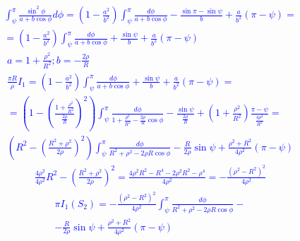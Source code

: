 %
\textcolor{blue}{ \begin{equation*} \begin{aligned}
\int_{\psi}^{\pi} \frac{\sin^2{\phi}}{a + b \cos \phi} d \phi =  
\left( 1 - \frac{a^2}{b^2} \right)
\int_{\psi}^{\pi} \frac{d \phi}{a + b \cos \phi} -
\frac{\sin \pi - \sin \psi}{b} + \frac{a}{b^2} (\pi - \psi) = \\
= \left( 1 - \frac{a^2}{b^2} \right)
\int_{\psi}^{\pi} \frac{d \phi}{a + b \cos \phi} +
\frac{\sin \psi}{b} + \frac{a}{b^2} (\pi - \psi)
\end{aligned} \end{equation*} }
%
\textcolor{blue}{ \begin{equation*} \begin{aligned}
a = 1 + \frac{\rho^2}{R^2}; b = - \frac{2 \rho}{ R } \\
\frac{\pi R}{\rho} I_1 = \left( 1 - \frac{a^2}{b^2} \right)
\int_{\psi}^{\pi} \frac{d \phi}{a + b \cos \phi} +
\frac{\sin \psi}{b} + \frac{a}{b^2} (\pi - \psi) = \\
= \left( 1 - \left( \frac{1 + \frac{\rho^2}{R^2}} 
{ \frac{2 \rho}{R} } \right)^2 \right) 
\int_{\psi}^{\pi} \frac{d \phi}{1 + \frac{\rho^2}{R^2} -  
\frac{2 \rho}{R} \cos \phi} -
\frac{\sin \psi}{\frac{2 \rho}{ R }} + \left( 1 + \frac{\rho^2}{R^2} \right) 
\frac{\pi - \psi}{\frac{4 \rho^2}{R^2}} = \\
\left( R^2 - \left( \frac{R^2 + \rho^2}{2 \rho} \right)^2 \right) 
\int_{\psi}^{\pi} \frac{d \phi}{R^2 + \rho^2 - 2 \rho R \cos \phi} -
\frac{R}{2 \rho} \sin \psi + \frac{\rho^2 + R^2}{4 \rho^2} (\pi - \psi)  
\end{aligned} \end{equation*} }
%
\textcolor{blue}{ \begin{equation*} \begin{aligned}
\frac{4 \rho^2}{4 \rho^2} R^2 - \left( \frac{R^2 + \rho^2}{2 \rho} \right)^2 =
\frac{4 \rho^2 R^2 - R^4 - 2 \rho^2 R^2 - \rho^4}{4 \rho^2} =
- \frac{\left( \rho^2 - R^2 \right)^2}{4 \rho^2} 
\end{aligned} \end{equation*} }
%
\textcolor{blue}{ \begin{equation*} \begin{aligned}
\pi I_1 (S_2) = - \frac{\left( \rho^2 - R^2 \right)^2}{4 \rho^2} 
\int_{\psi}^{\pi} \frac{d \phi}{R^2 + \rho^2 - 2 \rho R \cos \phi} - \\
- \frac{R}{2 \rho} \sin \psi + \frac{\rho^2 + R^2}{4 \rho^2}  (\pi - \psi)
\end{aligned} \end{equation*} }

